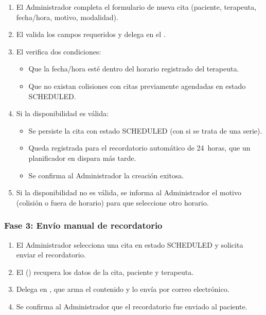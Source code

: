 \begin{enumerate}
  \item El Administrador completa el formulario de nueva cita (paciente, terapeuta, fecha/hora, motivo, modalidad).
  \item El  valida los campos requeridos y delega en el .
  \item El  verifica dos condiciones:
  \begin{itemize}
    \item Que la fecha/hora esté dentro del horario registrado del terapeuta.
    \item Que no existan colisiones con citas previamente agendadas en estado SCHEDULED.
  \end{itemize}
  \item Si la disponibilidad es válida:
  \begin{itemize}
    \item Se persiste la cita con estado SCHEDULED (con  si se trata de una serie).
    \item Queda registrada para el recordatorio automático de 24~horas, que un planificador en  dispara más tarde.
    \item Se confirma al Administrador la creación exitosa.
  \end{itemize}
  \item Si la disponibilidad no es válida, se informa al Administrador el motivo (colisión o fuera de horario) para que seleccione otro horario.
\end{enumerate}

\subsubsection{Fase 3: Envío manual de recordatorio}

\begin{enumerate}
  \item El Administrador selecciona una cita en estado SCHEDULED y solicita enviar el recordatorio.
  \item El  () recupera los datos de la cita, paciente y terapeuta.
  \item Delega en , que arma el contenido y lo envía por correo electrónico.
  \item Se confirma al Administrador que el recordatorio fue enviado al paciente.
\end{enumerate}

